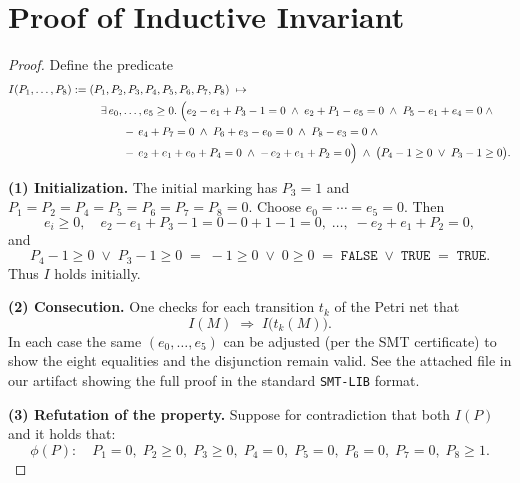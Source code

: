 \appendix

\section{Proof of Inductive Invariant}
\label{appendix:InductiveInvariantExample}


\begin{proof}
	
Define the predicate
\[
\begin{aligned}
	I(P_{1},\dots,P_{8})
	:={}&
		(P_{1},\textcolor{black}{P_{2}},\textcolor{black}{P_{3}},P_{4},P_{5},P_{6},\textcolor{black}{P_{7}},\textcolor{black}{P_{8}})
		\;\mapsto\;\\
		&\quad
		\exists\,e_{0},\dots,e_{5}\ge0.\;
		\Bigl(
		e_{2}-e_{1}+\textcolor{black}{P_{3}}-1=0\;\land\;
		e_{2}+P_{1}-e_{5}=0\;\land\;
		P_{5}-e_{1}+e_{4}=0\;\land\\
		&\qquad\quad
		-\,e_{4}+\textcolor{black}{P_{7}}=0\;\land\;
		P_{6}+e_{3}-e_{0}=0\;\land\;
		\textcolor{black}{P_{8}}-e_{3}=0\;\land\\
		&\qquad\quad
		-\,e_{2}+e_{1}+e_{0}+P_{4}=0\;\land\;
		-\,e_{2}+e_{1}+\textcolor{black}{P_{2}}=0
		\Bigr)
		\;\land\;
		\bigl(P_{4}-1\ge0\;\lor\;\textcolor{black}{P_{3}}-1\ge0\bigr).
	\end{aligned}
	\]
	
	
	\medskip\noindent
	\textbf{(1) Initialization.}
	The initial marking has $P_{3}=1$ and $P_{1}=P_{2}=P_{4}=P_{5}=P_{6}=P_{7}=P_{8}=0$.
	Choose $e_{0}=\cdots=e_{5}=0$.  Then
	\[
	e_{i}\ge0,\quad
	e_{2}-e_{1}+P_{3}-1=0-0+1-1=0,\;\dots,\;-e_{2}+e_{1}+P_{2}=0,
	\]
	and 
	\[
	P_{4}-1\ge0\;\lor\;P_{3}-1\ge0
	\;=\;-1\ge0\;\lor\;0\ge0
	\;=\;\texttt{FALSE}\;\lor\;\texttt{TRUE}
	\;=\;\texttt{TRUE}.
	\]
	Thus $I$ holds initially.
	
	\medskip\noindent
	\textbf{(2) Consecution.}
	One checks for each transition $t_{k}$ of the Petri net that
	\[
	I(M)\;\Longrightarrow\;I\bigl(t_{k}(M)\bigr).
	\]
	In each case the same $(e_{0},\dots,e_{5})$ can be adjusted (per the SMT certificate) to show the eight equalities and the disjunction remain valid. See the attached file in our artifact showing the full proof in the standard \texttt{SMT-LIB} format.
	
	\medskip\noindent
	\textbf{(3) Refutation of the property.}
	Suppose for contradiction that both $I(P)$ and it holds that:
	\[
	\phi(P):\quad
	P_{1}=0,\;
	P_{2}\ge0,\;
	P_{3}\ge0,\;
	P_{4}=0,\;
	P_{5}=0,\;
	P_{6}=0,\;
	P_{7}=0,\;
	P_{8}\ge1.
	\] 
	

\end{proof}
